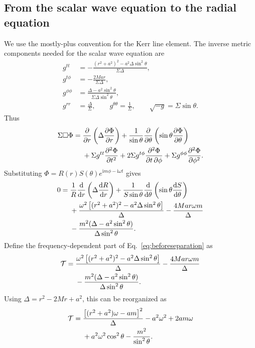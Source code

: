 \documentclass[aps,prd,twocolumn,nofootinbib,superscriptaddress,10pt,floatfix]{revtex4-2}
\newcommand{\ii}{\mathrm{i}}
\newcommand{\dd}{\mathrm{d}}
\begin{document}
\subsection{From the scalar wave equation to the radial equation}

We use the mostly-plus convention for the Kerr line element.  The inverse
metric components needed for the scalar wave equation are
\begin{align}
g^{tt}
&=
-\frac{(r^2+a^2)^2-a^2\Delta\sin^2\theta}{\Sigma\Delta},
\\
g^{t\phi}
&=
-\frac{2Mar}{\Sigma\Delta},
\\
g^{\phi\phi}
&=
\frac{\Delta-a^2\sin^2\theta}{\Sigma\Delta\sin^2\theta},
\\
g^{rr}&=\frac{\Delta}{\Sigma},\qquad
g^{\theta\theta}=\frac{1}{\Sigma},
\qquad
\sqrt{-g}=\Sigma\sin\theta .
\end{align}
Thus
\begin{align}
\Sigma\Box\Phi
={}&
\frac{\partial}{\partial r}
\left(\Delta\frac{\partial\Phi}{\partial r}\right)
+\frac{1}{\sin\theta}
\frac{\partial}{\partial\theta}
\left(\sin\theta\frac{\partial\Phi}{\partial\theta}\right)
\notag\\
&+\Sigma g^{tt}\frac{\partial^2\Phi}{\partial t^2}
+2\Sigma g^{t\phi}
\frac{\partial^2\Phi}{\partial t\,\partial\phi}
+\Sigma g^{\phi\phi}
\frac{\partial^2\Phi}{\partial\phi^2}.
\label{eq:boxexpanded}
\end{align}
Substituting
$\Phi=R(r)S(\theta)e^{\ii m\phi-\ii\omega t}$ gives
\begin{align}
0={}&
\frac{1}{R}\frac{\dd}{\dd r}
\left(\Delta\frac{\dd R}{\dd r}\right)
+\frac{1}{S\sin\theta}
\frac{\dd}{\dd\theta}
\left(\sin\theta\frac{\dd S}{\dd\theta}\right)
\notag\\
&+
\frac{\omega^2\left[(r^2+a^2)^2-a^2\Delta\sin^2\theta\right]}
{\Delta}
-\frac{4Mar\omega m}{\Delta}
\notag\\
&-
\frac{m^2(\Delta-a^2\sin^2\theta)}
{\Delta\sin^2\theta}.
\label{eq:beforeseparation}
\end{align}
Define the frequency-dependent part of Eq.~\eqref{eq:beforeseparation} as
\begin{align}
\mathcal{T}={}&
\frac{\omega^2\left[(r^2+a^2)^2-a^2\Delta\sin^2\theta\right]}
{\Delta}
-\frac{4Mar\omega m}{\Delta}
\notag\\
&-
\frac{m^2(\Delta-a^2\sin^2\theta)}
{\Delta\sin^2\theta}.
\end{align}
Using $\Delta=r^2-2Mr+a^2$, this can be reorganized as
\begin{align}
\mathcal{T}={}&
\frac{\left[(r^2+a^2)\omega-am\right]^2}{\Delta}
-a^2\omega^2
+2am\omega
\notag\\
&+
a^2\omega^2\cos^2\theta
-\frac{m^2}{\sin^2\theta}.
\label{eq:kerrsplit}
\end{align}
\end{document}
